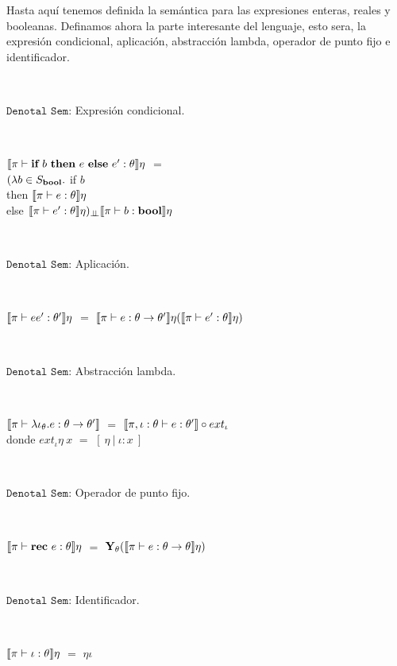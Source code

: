 Hasta aqu\'i tenemos definida la sem\'antica para las expresiones enteras,
reales y booleanas. Definamos ahora la parte interesante del lenguaje, esto 
sera, la expresi\'on condicional, aplicaci\'on, abstracci\'on lambda, operador
de punto fijo e identificador.

\

\noindent
$\texttt{Denotal Sem:}$ Expresi\'on condicional.\

\

$\llbracket \pi \vdash \textbf{if} \ b \ \textbf{then} \ e \ \textbf{else} \ e' : \theta \rrbracket\eta$ $=$\\
		\indent \indent \indent $(\lambda b \in S_{\textbf{bool}} .$ if $b$ \\
		\indent \indent \indent \indent \indent \indent \indent 
											then $\llbracket \pi \vdash e : \theta \rrbracket\eta$\\
		\indent \indent \indent \indent \indent \indent \indent 
											else $\llbracket \pi \vdash e' : \theta \rrbracket\eta)_{\bot \!\!\! \bot}\llbracket \pi \vdash b : \textbf{bool} \rrbracket\eta$

\

\noindent
$\texttt{Denotal Sem:}$ Aplicaci\'on.\

\

$\llbracket \pi \vdash ee' : \theta' \rrbracket\eta$ $=$ $\llbracket \pi \vdash e : \theta \rightarrow \theta' \rrbracket\eta
														  (\llbracket \pi \vdash e' : \theta \rrbracket\eta)$

\

\noindent
$\texttt{Denotal Sem:}$ Abstracci\'on lambda.\

\

$\llbracket \pi \vdash \lambda \iota_{\theta} . e : \theta \rightarrow \theta' \rrbracket$ $=$
						$\llbracket \pi,\iota:\theta \vdash e : \theta' \rrbracket \circ ext_{\iota}$\\

donde $ext_{\iota} \eta \ x$ $=$ $[\ \eta \ | \ \iota:x \ ]$

\

\noindent
$\texttt{Denotal Sem:}$ Operador de punto fijo.\

\

$\llbracket \pi \vdash \textbf{rec} \ e : \theta \rrbracket\eta$ $=$ $\textbf{Y}_{\theta} (\llbracket \pi \vdash e : \theta \rightarrow \theta \rrbracket\eta)$

\

\noindent
$\texttt{Denotal Sem:}$ Identificador.\

\

$\llbracket \pi \vdash \iota : \theta \rrbracket\eta$ $=$ $\eta \iota$\\

